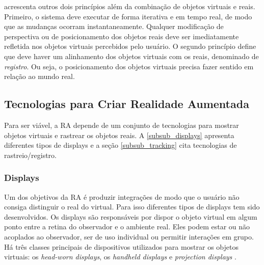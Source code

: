 
 acrescenta outros dois princípios além da combinação de objetos virtuais e reais. Primeiro, o sistema deve executar de forma iterativa e em tempo real, de modo que as mudanças ocorram instantaneamente. Qualquer modificação de perspectiva ou de posicionamento dos objetos reais deve ser imediatamente refletida nos objetos virtuais percebidos pelo usuário. O segundo princípio define que deve haver um alinhamento dos objetos virtuais com os reais, denominado de \textit{registro}. Ou seja, o posicionamento dos objetos virtuais precisa fazer sentido em relação ao mundo real.

\subsection{Tecnologias para Criar Realidade Aumentada}

Para ser viável, a RA depende de um conjunto de tecnologias para mostrar objetos virtuais e rastrear os objetos reais. A \autoref{subsub_displays} apresenta diferentes tipos de displays e a seção \autoref{subsub_tracking} cita tecnologias de rastreio/registro.

\subsubsection{Displays}
\label{subsub_displays}

Um dos objetivos da RA é produzir integrações de modo que o usuário não consiga distinguir o real do virtual. Para isso diferentes tipos de displays tem sido desenvolvidos. Os displays são responsáveis por dispor o objeto virtual em algum ponto entre a retina do observador e o ambiente real. Eles podem estar ou não acoplados ao observador, ser de uso individual ou permitir interações em grupo. Há três classes principais de dispositivos utilizados para mostrar os objetos virtuais: os \textit{head-worn displays}, os \textit{handheld displays} e \textit{projection displays} \cite{azuma_recent_2001}.

